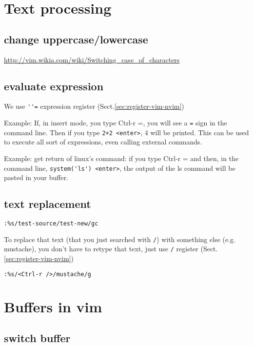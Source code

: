 \section{Text processing}

\subsection{change uppercase/lowercase}

\url{http://vim.wikia.com/wiki/Switching_case_of_characters}

\subsection{evaluate expression}
\label{sec:vim-evaluate-expression}
\label{sec:vim-evaluate-commands}

We use \verb!''=! expression register (Sect.\ref{sec:register-vim-nvim})

Example: If, in insert mode, you type Ctrl-r =, you will see a \verb!=! sign in
the command line. Then if you type \verb!2+2 <enter>!, 4 will be printed. This
    can be used to execute all sort of expressions, even calling external
    commands.


Example: get return of linux's command: if you type Ctrl-r = and then, in the
command line, \verb!system('ls') <enter>!, the output of the ls command will be
pasted in your buffer.

\subsection{text replacement}

\begin{verbatim}
:%s/test-source/test-new/gc
\end{verbatim}

To replace that text (that you just searched with \verb!/!) with something else
(e.g. mustache), you don't have to retype that text, just use \verb!/! register
(Sect.\ref{sec:register-vim-nvim})
\begin{verbatim}
:%s/<Ctrl-r />/mustache/g
\end{verbatim}



\section{Buffers in vim}
\label{sec:vim-buffer}

\subsection{switch buffer}
\label{sec:vim-buffer-switch}

